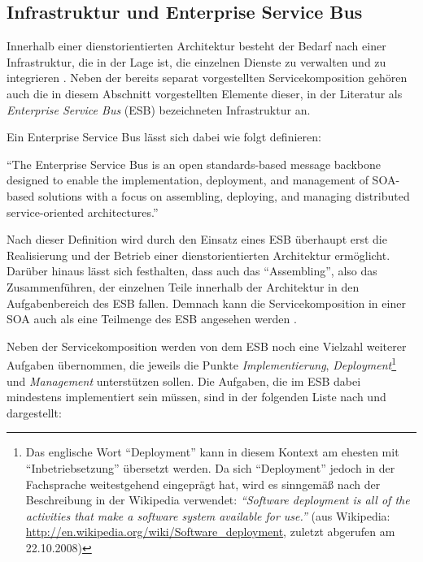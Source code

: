 

\subsection{Infrastruktur und Enterprise Service Bus} %
\label{sub:infrastruktur}

  Innerhalb einer dienstorientierten Architektur besteht der Bedarf nach einer Infrastruktur, die in der Lage ist, die einzelnen Dienste zu verwalten und zu integrieren \citep[S. 270]{web_services_principles_and_technology}. Neben der bereits separat vorgestellten Servicekomposition gehören auch die in diesem Abschnitt vorgestellten Elemente dieser, in der Literatur als \emph{Enterprise Service Bus} (ESB) bezeichneten Infrastruktur an.
  
  Ein Enterprise Service Bus lässt sich dabei wie folgt definieren:
  
  \begin{definition}[ESB]\label{def:enterprise_serivce_bus}
    "`The Enterprise Service Bus is an open standards-based message backbone designed to enable the implementation, deployment, and management of SOA-based solutions with a focus on assembling, deploying, and managing distributed service-oriented architectures."' \emph{\citep[S. 270]{web_services_principles_and_technology}}
  \end{definition}
  
  Nach dieser Definition wird durch den Einsatz eines ESB überhaupt erst die Realisierung und der Betrieb einer dienstorientierten Architektur ermöglicht. Darüber hinaus lässt sich festhalten, dass auch das "`Assembling"', also das Zusammenführen, der einzelnen Teile innerhalb der Architektur in den Aufgabenbereich des ESB fallen. Demnach kann die Servicekomposition in einer SOA auch als eine Teilmenge des ESB angesehen werden \citep[S. 3]{enterprise_service_bus}.

  Neben der Servicekomposition werden von dem ESB noch eine Vielzahl weiterer Aufgaben übernommen, die jeweils die Punkte \emph{Implementierung}, \emph{Deployment}\footnote{Das englische Wort "`Deployment"' kann in diesem Kontext am ehesten mit "`Inbetriebsetzung"' übersetzt werden. Da sich "`Deployment"' jedoch in der Fachsprache weitestgehend eingeprägt hat, wird es sinngemäß nach der Beschreibung in der Wikipedia verwendet: \emph{"`Software deployment is all of the activities that make a software system available for use."'} (aus Wikipedia: \url{http://en.wikipedia.org/wiki/Software_deployment}, zuletzt abgerufen am 22.10.2008)} und \emph{Management} unterstützen sollen. Die Aufgaben, die im ESB dabei mindestens implementiert sein müssen, sind in der folgenden Liste nach \citep[S. 137]{soa_goes_real} und \citep[S. 146]{masak2007ssb} dargestellt:
  
